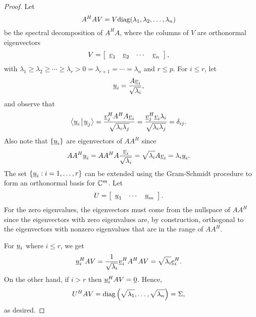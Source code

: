 \begin{proof}
Let
\begin{equation*}
A^H A V = V \mathrm{diag} ( \lambda_1, \lambda_2, \ldots, \lambda_n )
\end{equation*}
be the spectral decomposition of $A^H A$, where the columns of $V$ are orthonormal eigenvectors
\begin{equation*}
V = \left[ \begin{array}{cccc} \underline{v}_1 & \underline{v}_2 & \cdots & \underline{v}_n \end{array} \right], 
\end{equation*}
with $\lambda_1 \geq \lambda_2 \geq \cdots \geq \lambda_r > 0 = \lambda_{r+1} = \cdots = \lambda_{n}$ and $r \leq p$.
For $i \leq r$, let
\begin{equation*}
\underline{u}_i = \frac{A \underline{v}_i}{\sqrt{\lambda_i}},
\end{equation*}
and observe that
\begin{equation*}
{\left\langle  \underline{u}_i  \mskip2mu \middle| \mskip2mu  \underline{u}_j  \right\rangle}
= \frac{\underline{v}_j^H A^H A \underline{v}_i}{\sqrt{\lambda_i \lambda_j}}
= \frac{\underline{v}_j^H \underline{v}_i \lambda_i}{\sqrt{\lambda_i \lambda_j}}
= \delta_{ij} .
\end{equation*}
Also note that $\{ \underline{u}_i \}$ are eigenvectors of $A A^H$ since
\begin{equation*}
A A^H \underline{u}_i
= A A^H A \frac{\underline{v}_i}{\sqrt{\lambda_i}}
= \sqrt{\lambda_i} A \underline{v}_i
= \lambda_i \underline{u}_i .
\end{equation*}
The set $\left\{ \underline{u}_i: i = 1, \ldots, r \right\}$ can be extended using the Gram-Schmidt procedure to form an orthonormal basis for $\mathbb{C}^m$.
Let
\begin{equation*}
U = \left[ \begin{array}{ccc} \underline{u}_1 & \cdots & \underline{u}_m \end{array} \right] .
\end{equation*}
For the zero eigenvalues, the eigenvectors must come from the nullspace of $A A^H$ since the eigenvectors with zero eigenvalues are, by construction, orthogonal to the eigenvectors with nonzero eigenvalues that are in the range of $A A^H$.

For $\underline{u}_i$ where $i \leq r$, we get
\begin{equation*}
\underline{u}_i^H A V 
= \frac{1}{\sqrt{\lambda_i}} \underline{v}_i^H A^H A V
= \sqrt{\lambda_i} \underline{e}_i^H .
\end{equation*}
On the other hand, if $i > r$ then $\underline{u}_i^H A V = \underline{0}$.
Hence,
\begin{equation*}
U^H A V = \mathrm{diag} \left( \sqrt{\lambda_1}, \ldots, \sqrt{\lambda_n} \right)
= \Sigma ,
\end{equation*}
as desired.
\end{proof}

